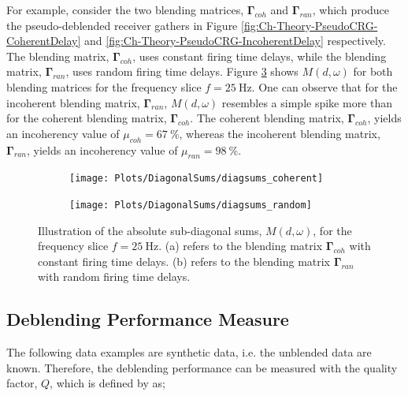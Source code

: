 For example, consider the two blending matrices, $\mathbf{\Gamma}_{coh}$ and $\mathbf{\Gamma}_{ran}$, which produce the pseudo-deblended receiver gathers in Figure \ref{fig:Ch-Theory-PseudoCRG-CoherentDelay} and \ref{fig:Ch-Theory-PseudoCRG-IncoherentDelay} respectively. The blending matrix, $\mathbf{\Gamma}_{coh}$, uses constant firing time delays, while the blending matrix, $\mathbf{\Gamma}_{ran}$, uses random firing time delays. Figure \ref{fig:Ch-Incoherency-Coh-vs-Ran-Diag} shows $M(d,\omega)$ for both blending matrices for the frequency slice $f=\SI{25}{\hertz}$. One can observe that for the incoherent blending matrix, $\mathbf{\Gamma}_{ran}$, $M(d,\omega)$ resembles a simple spike more than for the coherent blending matrix, $\mathbf{\Gamma}_{coh}$. The coherent blending matrix, $\mathbf{\Gamma}_{coh}$,  yields an incoherency value of $\mu_{coh} = \SI{67}{\percent}$, whereas the incoherent blending matrix, $\mathbf{\Gamma}_{ran}$, yields an incoherency value of $\mu_{ran} = \SI{98}{\percent}$.

\begin{figure}
	
	\centering
	\begin{subfigure}[b]{0.45\textwidth}
	\centering
	\texttt{[image: Plots/DiagonalSums/diagsums\_coherent]}	
	\caption{}
	\label{fig:Ch-Incoherency-CoherentDiag}	
	\end{subfigure}
	\centering
	\begin{subfigure}[b]{0.45\textwidth}
	\centering
	\texttt{[image: Plots/DiagonalSums/diagsums\_random]}	
	\caption{}
	\label{fig:Ch-Incoherency-RandomDiag}	
	\end{subfigure}
	
	\caption{Illustration of the absolute sub-diagonal sums, $M(d,\omega)$, for the frequency slice $f=\SI{25}{\hertz}$. (a) refers to the blending matrix $\mathbf{\Gamma}_{coh}$ with constant firing time delays.  (b) refers to the blending matrix $\mathbf{\Gamma}_{ran}$ with random firing time delays.}
	\label{fig:Ch-Incoherency-Coh-vs-Ran-Diag}
	
\end{figure}


\subsection*{Deblending Performance Measure}

The following data examples are synthetic data, i.e. the unblended data are known. Therefore, the deblending performance can be measured with the quality factor, $Q$, which is defined by \citet{IbrahimQuality} as;

